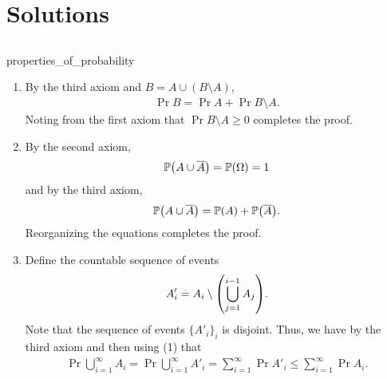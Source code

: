 \chapter{Solutions}

\section*{}

\begin{solution}{properties_of_probability}
  \begin{enumerate}[beginpenalty=10000]
    \item By the third axiom and $B = A \cup (B \setminus A)$, \begin{align*}
      \Pr{B} = \Pr{A} + \Pr{B \setminus A}.
    \end{align*}
    Noting from the first axiom that $\Pr{B \setminus A} \geq 0$ completes the proof.

    \item By the second axiom, \begin{align*}
      \Pr{A \cup \compl{A}} = \Pr{\Omega} = 1
    \end{align*} and by the third axiom, \begin{align*}
      \Pr{A \cup \compl{A}} = \Pr{A} + \Pr{\compl{A}}.
    \end{align*}
    Reorganizing the equations completes the proof.

    \item Define the countable sequence of events \begin{align*}
      A'_i \defeq A_i \setminus \parentheses*{\bigcup_{j=1}^{i-1} A_j}.
    \end{align*}
    Note that the sequence of events $\{A'_i\}_i$ is disjoint. Thus, we have by the third axiom and then using (1) that \begin{align*}
      \Pr{\bigcup_{i=1}^\infty A_i} = \Pr{\bigcup_{i=1}^\infty A'_i} = \sum_{i=1}^\infty \Pr{A'_i} \leq \sum_{i=1}^\infty \Pr{A_i}.
    \end{align*}
  \end{enumerate}
\end{solution}

